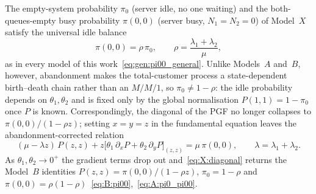 \begin{corollary}\label{cor:X:pi00}
    The empty-system probability $\pi_0$ (server idle, no one waiting) and the
    both-queues-empty busy probability $\pi(0,0)$ (server busy, $N_1=N_2=0$) of
    Model~$X$ satisfy the universal idle balance
    \begin{equation}
        \pi(0,0) = \rho\,\pi_0,
        \qquad \rho=\frac{\lambda_1+\lambda_2}{\mu},
        \label{eq:X:pi00}
    \end{equation}
    as in every model of this work~\eqref{eq:gen:pi00_general}. Unlike Models~$A$
    and~$B$, however, abandonment makes the total-customer process a state-dependent
    birth--death chain rather than an $M/M/1$, so $\pi_0\neq 1-\rho$: the idle
    probability depends on $\theta_1,\theta_2$ and is fixed only by the global
    normalisation $P(1,1)=1-\pi_0$ once $P$ is known. Correspondingly, the diagonal of
    the PGF no longer collapses to $\pi(0,0)/(1-\rho z)$; setting $x=y=z$ in the
    fundamental equation leaves the abandonment-corrected relation
    \begin{equation}
        (\mu-\lambda z)\,P(z,z)
        + z\bigl[\theta_1\,\partial_x P + \theta_2\,\partial_y P\bigr]_{(z,z)}
        = \mu\,\pi(0,0),
        \qquad \lambda=\lambda_1+\lambda_2.
        \label{eq:X:diagonal}
    \end{equation}
    As $\theta_1,\theta_2\to 0^+$ the gradient terms drop out and~\eqref{eq:X:diagonal}
    returns the Model~$B$ identities $P(z,z)=\pi(0,0)/(1-\rho z)$, $\pi_0=1-\rho$ and
    $\pi(0,0)=\rho(1-\rho)$~\eqref{eq:B:pi00},~\eqref{eq:A:pi0_pi00}.
\end{corollary}

